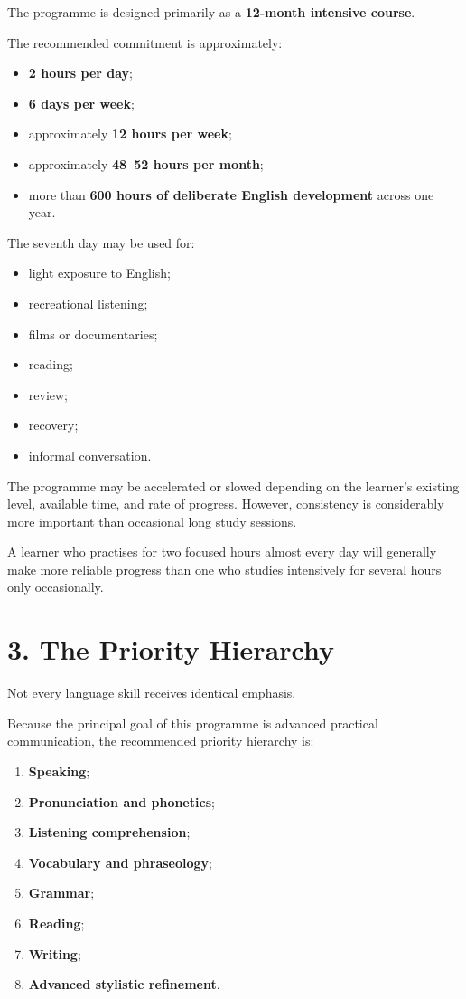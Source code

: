 The programme is designed primarily as a \textbf{12-month intensive course}.

The recommended commitment is approximately:

\begin{itemize}
    \item \textbf{2 hours per day};
    \item \textbf{6 days per week};
    \item approximately \textbf{12 hours per week};
    \item approximately \textbf{48--52 hours per month};
    \item more than \textbf{600 hours of deliberate English development} across one year.
\end{itemize}

The seventh day may be used for:

\begin{itemize}
    \item light exposure to English;
    \item recreational listening;
    \item films or documentaries;
    \item reading;
    \item review;
    \item recovery;
    \item informal conversation.
\end{itemize}

The programme may be accelerated or slowed depending on the learner's existing level, available time, and rate of progress. However, consistency is considerably more important than occasional long study sessions.

A learner who practises for two focused hours almost every day will generally make more reliable progress than one who studies intensively for several hours only occasionally.

\section*{3. The Priority Hierarchy}

Not every language skill receives identical emphasis.

Because the principal goal of this programme is advanced practical communication, the recommended priority hierarchy is:

\begin{enumerate}
    \item \textbf{Speaking};
    \item \textbf{Pronunciation and phonetics};
    \item \textbf{Listening comprehension};
    \item \textbf{Vocabulary and phraseology};
    \item \textbf{Grammar};
    \item \textbf{Reading};
    \item \textbf{Writing};
    \item \textbf{Advanced stylistic refinement}.
\end{enumerate}

